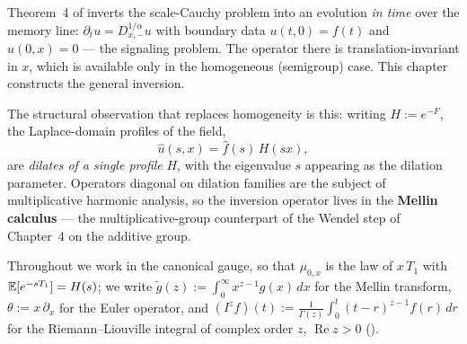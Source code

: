 %

Theorem~4 of  inverts the scale-Cauchy problem into an
evolution \emph{in time} over the memory line: $\partial_t u = D^{1/\alpha}_{x,-} u$ with
boundary data $u(t, 0) = f(t)$ and $u(0, x) = 0$ --- the signaling problem. The operator there
is translation-invariant in $x$, which is available only in the homogeneous (semigroup) case.
This chapter constructs the general inversion.

The structural observation that replaces homogeneity is this: writing $H := e^{-F}$, the
Laplace-domain profiles of the field,
\[
  \hat u(s, x) = \hat f(s)\, H(sx),
\]
are \emph{dilates of a single profile} $H$, with the eigenvalue $s$ appearing as the dilation
parameter. Operators diagonal on dilation families are the subject of multiplicative harmonic
analysis, so the inversion operator lives in the \textbf{Mellin calculus} --- the
multiplicative-group counterpart of the Wendel step of Chapter~4 on the additive group.

Throughout we work in the canonical gauge, so that $\mu_{0,x}$ is the law of $x\,T_1$ with
$\mathbb{E}[e^{-sT_1}] = H(s)$; we write $\tilde g(z) := \int_0^\infty x^{z-1} g(x)\,dx$ for the
Mellin transform, $\theta := x\,\partial_x$ for the Euler operator, and
$(I^z f)(t) := \tfrac{1}{\Gamma(z)}\int_0^t (t-r)^{z-1} f(r)\,dr$ for the Riemann--Liouville
integral of complex order $z$, $\operatorname{Re} z > 0$ ().

